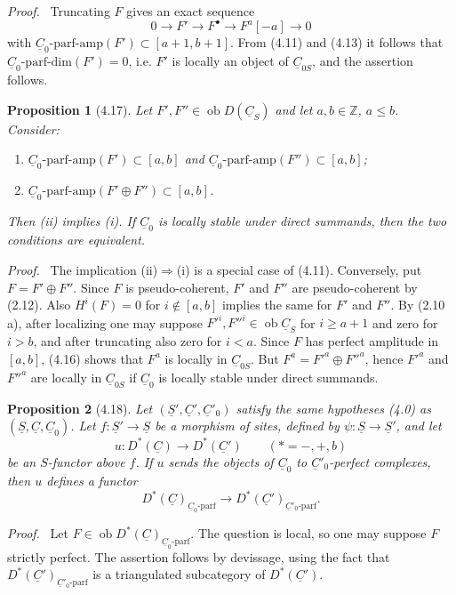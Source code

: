 \documentclass[13pt]{extarticle}
\newcommand{\ZZ}{\mathbb Z}
\newcommand{\uS}{\underline S}
\newcommand{\uC}{\underline C}
\newcommand{\ob}{\operatorname{ob}}
\newenvironment{prooftext}[1][Proof]{\par\noindent\emph{#1.}\ }{\par\medskip}
\newtheorem*{proposition*}{Proposition}
\begin{document}
\begin{prooftext}
Truncating $F$ gives an exact sequence
\[
0\longrightarrow F'\longrightarrow F^\bullet\longrightarrow F^a[-a]\longrightarrow0
\]
with $\uC_0\text{-parf-amp}(F')\subset[a+1,b+1]$. From (4.11) and (4.13) it follows that $\uC_0\text{-parf-dim}(F')=0$, i.e. $F'$ is locally an object of $\uC_{0S}$, and the assertion follows.
\end{prooftext}

\begin{proposition*}[4.17]
Let $F',F''\in\ob D(\uC_S)$ and let $a,b\in\ZZ$, $a\leq b$. Consider:
\begin{enumerate}[label=(\roman*)]
\item $\uC_0\text{-parf-amp}(F')\subset[a,b]$ and $\uC_0\text{-parf-amp}(F'')\subset[a,b]$;
\item $\uC_0\text{-parf-amp}(F'\oplus F'')\subset[a,b]$.
\end{enumerate}
Then (ii) implies (i). If $\uC_0$ is locally stable under direct summands, then the two conditions are equivalent.
\end{proposition*}

\begin{prooftext}
The implication (ii)$\Rightarrow$(i) is a special case of (4.11). Conversely, put $F=F'\oplus F''$. Since $F$ is pseudo-coherent, $F'$ and $F''$ are pseudo-coherent by (2.12). Also $H^i(F)=0$ for $i\notin[a,b]$ implies the same for $F'$ and $F''$. By (2.10 a), after localizing one may suppose $F'^i,F''^i\in\ob\uC_S$ for $i\geq a+1$ and zero for $i>b$, and after truncating also zero for $i<a$. Since $F$ has perfect amplitude in $[a,b]$, (4.16) shows that $F^a$ is locally in $\uC_{0S}$. But $F^a=F'^a\oplus F''^a$, hence $F'^a$ and $F''^a$ are locally in $\uC_{0S}$ if $\uC_0$ is locally stable under direct summands.
\end{prooftext}

\begin{proposition*}[4.18]
Let $(\uS',\uC',\uC'_0)$ satisfy the same hypotheses (4.0) as $(\uS,\uC,\uC_0)$. Let $f:\uS'\to\uS$ be a morphism of sites, defined by $\psi:\uS\to\uS'$, and let
\[
u:D^*(\uC)\longrightarrow D^*(\uC')\qquad (*=-,+,b)
\]
be an $S$-functor above $f$. If $u$ sends the objects of $\uC_0$ to $\uC'_0$-perfect complexes, then $u$ defines a functor
\[
D^*(\uC)_{\uC_0\text{-parf}}
\longrightarrow
D^*(\uC')_{\uC'_0\text{-parf}}.
\]
\end{proposition*}

\begin{prooftext}
Let $F\in\ob D^*(\uC)_{\uC_0\text{-parf}}$. The question is local, so one may suppose $F$ strictly perfect. The assertion follows by devissage, using the fact that $D^*(\uC')_{\uC'_0\text{-parf}}$ is a triangulated subcategory of $D^*(\uC')$.
\end{prooftext}
\end{document}
